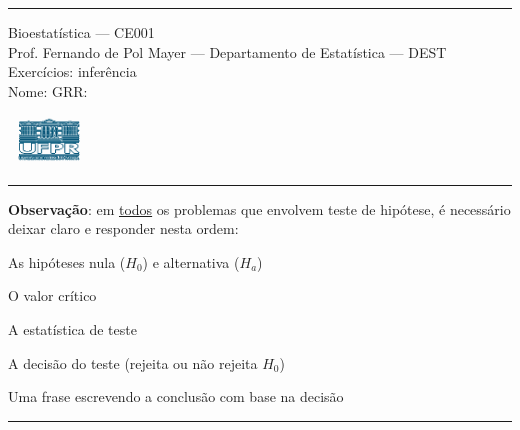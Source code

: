 \documentclass[a4paper,11pt,fleqn]{article}\usepackage[]{graphicx}\usepackage[]{color}
\theoremstyle{definition}
\begin{document}
\reversemarginpar %





\hrule
\vspace{0.3cm}

\begin{minipage}[c]{.85\textwidth}
  Bioestatística --- CE001 \\
  Prof. Fernando de Pol Mayer --- Departamento de Estatística --- DEST \\
  Exercícios: inferência \\
  Nome:   \hfill GRR: \hspace{2cm}
\end{minipage}\hfill
\begin{minipage}[c]{.15\textwidth}
\flushright
\includegraphics[width=2.2cm]{../img/ufpr-logo.png}
\end{minipage}

\vspace{0.3cm}
\hrule
\vspace{0.3cm}

\textbf{Observação}: em \underline{todos} os problemas que envolvem
teste de hipótese, é necessário deixar claro e responder nesta ordem:
\begin{compactenum}[(a)]
\item As hipóteses nula ($H_0$) e alternativa ($H_a$)
\item O valor crítico
\item A estatística de teste
\item A decisão do teste (rejeita ou não rejeita $H_0$)
\item Uma frase escrevendo a conclusão com base na decisão
\end{compactenum}

\vspace{0.3cm}
\hrule
\vspace{0.3cm}
\end{document}
